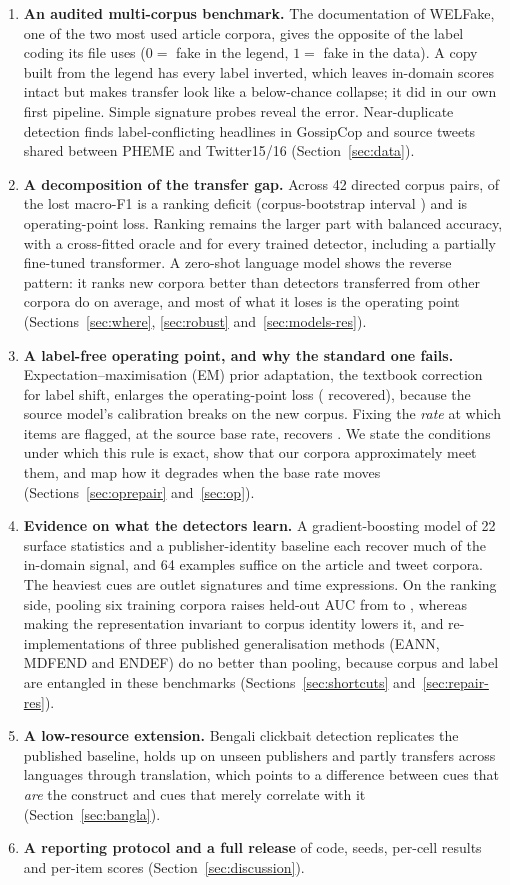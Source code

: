 \begin{enumerate}
\item \textbf{An audited multi-corpus benchmark.} The documentation of WELFake, one of the two most used article corpora, gives the opposite of the label coding its file uses ($0=$ fake in the legend, $1=$ fake in the data). A copy built from the legend has every label inverted, which leaves in-domain scores intact but makes transfer look like a below-chance collapse; it did in our own first pipeline. Simple signature probes reveal the error. Near-duplicate detection finds label-conflicting headlines in GossipCop and source tweets shared between PHEME and Twitter15/16 (Section~\ref{sec:data}).
\item \textbf{A decomposition of the transfer gap.} Across 42 directed corpus pairs, \RankShareAll{} of the lost macro-F1 is a ranking deficit (corpus-bootstrap interval \RankShareCI) and \OpShareAll{} is operating-point loss. Ranking remains the larger part with balanced accuracy, with a cross-fitted oracle and for every trained detector, including a partially fine-tuned transformer. A zero-shot language model shows the reverse pattern: it ranks new corpora better than detectors transferred from other corpora do on average, and most of what it loses is the operating point (Sections~\ref{sec:where}, \ref{sec:robust} and~\ref{sec:models-res}).
\item \textbf{A label-free operating point, and why the standard one fails.} Expectation--maximisation (EM) prior adaptation, the textbook correction for label shift, enlarges the operating-point loss (\RecEM{} recovered), because the source model's calibration breaks on the new corpus. Fixing the \emph{rate} at which items are flagged, at the source base rate, recovers \RecRank{}. We state the conditions under which this rule is exact, show that our corpora approximately meet them, and map how it degrades when the base rate moves (Sections~\ref{sec:oprepair} and~\ref{sec:op}).
\item \textbf{Evidence on what the detectors learn.} A gradient-boosting model of 22 surface statistics and a publisher-identity baseline each recover much of the in-domain signal, and 64 examples suffice on the article and tweet corpora. The heaviest cues are outlet signatures and time expressions. On the ranking side, pooling six training corpora raises held-out AUC from \LocoMeanSingle{} to \LocoPooled{}, whereas making the representation invariant to corpus identity lowers it, and re-implementations of three published generalisation methods (EANN, MDFEND and ENDEF) do no better than pooling, because corpus and label are entangled in these benchmarks (Sections~\ref{sec:shortcuts} and~\ref{sec:repair-res}).
\item \textbf{A low-resource extension.} Bengali clickbait detection replicates the published baseline, holds up on unseen publishers and partly transfers across languages through translation, which points to a difference between cues that \emph{are} the construct and cues that merely correlate with it (Section~\ref{sec:bangla}).
\item \textbf{A reporting protocol and a full release} of code, seeds, per-cell results and per-item scores (Section~\ref{sec:discussion}).
\end{enumerate}
